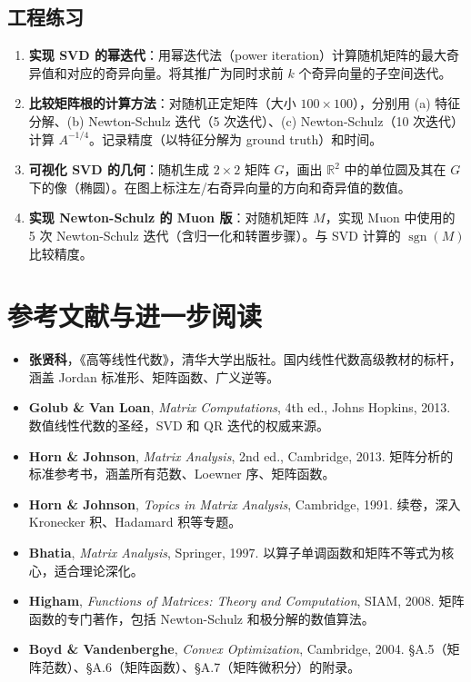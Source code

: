 \documentclass[12pt,a4paper]{ctexart}
\theoremstyle{definition}
\theoremstyle{plain}
\newcommand{\R}{\mathbb{R}}
\DeclareMathOperator{\sgn}{sgn}
\begin{document}
\subsection*{工程练习}

\begin{enumerate}
  \item \textbf{实现 SVD 的幂迭代}：用幂迭代法（power iteration）计算随机矩阵的最大奇异值和对应的奇异向量。将其推广为同时求前 $k$ 个奇异向量的子空间迭代。

  \item \textbf{比较矩阵根的计算方法}：对随机正定矩阵（大小 $100\times100$），分别用 (a) 特征分解、(b) Newton-Schulz 迭代（5 次迭代）、(c) Newton-Schulz（10 次迭代）计算 $A^{-1/4}$。记录精度（以特征分解为 ground truth）和时间。

  \item \textbf{可视化 SVD 的几何}：随机生成 $2\times2$ 矩阵 $G$，画出 $\R^2$ 中的单位圆及其在 $G$ 下的像（椭圆）。在图上标注左/右奇异向量的方向和奇异值的数值。

  \item \textbf{实现 Newton-Schulz 的 Muon 版}：对随机矩阵 $M$，实现 Muon 中使用的 5 次 Newton-Schulz 迭代（含归一化和转置步骤）。与 SVD 计算的 $\sgn(M)$ 比较精度。
\end{enumerate}

\section{参考文献与进一步阅读}

\begin{itemize}
  \item \textbf{张贤科}，《高等线性代数》，清华大学出版社。国内线性代数高级教材的标杆，涵盖 Jordan 标准形、矩阵函数、广义逆等。
  \item \textbf{Golub \& Van Loan}, \textit{Matrix Computations}, 4th ed., Johns Hopkins, 2013. 数值线性代数的圣经，SVD 和 QR 迭代的权威来源。
  \item \textbf{Horn \& Johnson}, \textit{Matrix Analysis}, 2nd ed., Cambridge, 2013. 矩阵分析的标准参考书，涵盖所有范数、Loewner 序、矩阵函数。
  \item \textbf{Horn \& Johnson}, \textit{Topics in Matrix Analysis}, Cambridge, 1991. 续卷，深入 Kronecker 积、Hadamard 积等专题。
  \item \textbf{Bhatia}, \textit{Matrix Analysis}, Springer, 1997. 以算子单调函数和矩阵不等式为核心，适合理论深化。
  \item \textbf{Higham}, \textit{Functions of Matrices: Theory and Computation}, SIAM, 2008. 矩阵函数的专门著作，包括 Newton-Schulz 和极分解的数值算法。
  \item \textbf{Boyd \& Vandenberghe}, \textit{Convex Optimization}, Cambridge, 2004. \S A.5（矩阵范数）、\S A.6（矩阵函数）、\S A.7（矩阵微积分）的附录。
\end{itemize}
\end{document}
